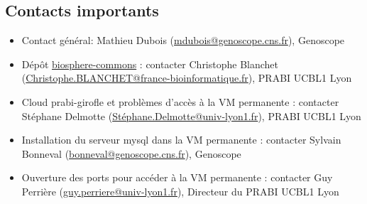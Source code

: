 \subsection{Contacts importants}

\begin{itemize}
	\item Contact général: Mathieu Dubois (\href{mailto:mdubois@genoscope.cns.fr}{mdubois@genoscope.cns.fr}), Genoscope
	\item Dépôt \href{https://github.com/IFB-ElixirFr/biosphere-commons}{biosphere-commons} : contacter Christophe Blanchet (\href{mailto:Christophe.BLANCHET@france-bioinformatique.fr}{Christophe.BLANCHET@france-bioinformatique.fr}), PRABI UCBL1 Lyon
	\item Cloud prabi-girofle et problèmes d'accès à la VM permanente : contacter Stéphane Delmotte (\href{mailto:Stéphane.Delmotte@univ-lyon1.fr}{Stéphane.Delmotte@univ-lyon1.fr}), PRABI UCBL1 Lyon
	\item Installation du serveur mysql dans la VM permanente : contacter Sylvain Bonneval (\href{mailto:bonneval@genoscope.cns.fr}{bonneval@genoscope.cns.fr}), Genoscope
	\item Ouverture des ports pour accéder à la VM permanente : contacter Guy Perrière (\href{mailto:guy.perriere@univ-lyon1.fr}{guy.perriere@univ-lyon1.fr}), Directeur du PRABI UCBL1 Lyon
\end{itemize}
